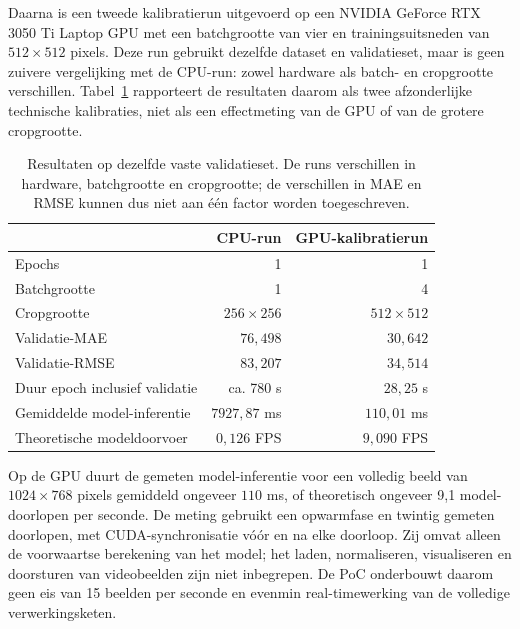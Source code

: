 Daarna is een tweede kalibratierun uitgevoerd op een NVIDIA GeForce RTX 3050 Ti Laptop GPU met een batchgrootte van vier en trainingsuitsneden van \(512 \times 512\) pixels. Deze run gebruikt dezelfde dataset en validatieset, maar is geen zuivere vergelijking met de CPU-run: zowel hardware als batch- en cropgrootte verschillen. Tabel~\ref{tab:kalibratieruns} rapporteert de resultaten daarom als twee afzonderlijke technische kalibraties, niet als een effectmeting van de GPU of van de grotere cropgrootte.

\begin{table}[htbp]
    \centering
    \small
    \begin{tabular}{lrr}
        \toprule
        & \textbf{CPU-run} & \textbf{GPU-kalibratierun} \\
        \midrule
        Epochs & 1 & 1 \\
        Batchgrootte & 1 & 4 \\
        Cropgrootte & \(256 \times 256\) & \(512 \times 512\) \\
        Validatie-MAE & \(76{,}498\) & \(30{,}642\) \\
        Validatie-RMSE & \(83{,}207\) & \(34{,}514\) \\
        Duur epoch inclusief validatie & ca. 780 s & \(28{,}25\) s \\
        Gemiddelde model-inferentie & \(7927{,}87\) ms & \(110{,}01\) ms \\
        Theoretische modeldoorvoer & \(0{,}126\) FPS & \(9{,}090\) FPS \\
        \bottomrule
    \end{tabular}
    \caption[Resultaten van de kalibratieruns]{Resultaten op dezelfde vaste validatieset. De runs verschillen in hardware, batchgrootte en cropgrootte; de verschillen in MAE en RMSE kunnen dus niet aan één factor worden toegeschreven.}
    \label{tab:kalibratieruns}
\end{table}

Op de GPU duurt de gemeten model-inferentie voor een volledig beeld van \(1024 \times 768\) pixels gemiddeld ongeveer \(110\) ms, of theoretisch ongeveer 9,1 model-doorlopen per seconde. De meting gebruikt een opwarmfase en twintig gemeten doorlopen, met CUDA-synchronisatie vóór en na elke doorloop. Zij omvat alleen de voorwaartse berekening van het model; het laden, normaliseren, visualiseren en doorsturen van videobeelden zijn niet inbegrepen. De PoC onderbouwt daarom geen eis van 15 beelden per seconde en evenmin real-timewerking van de volledige verwerkingsketen.

